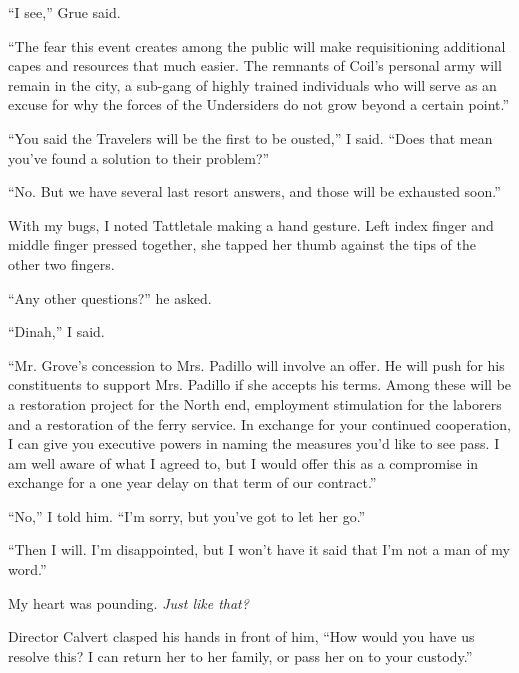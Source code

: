 ``I see,'' Grue said.



``The fear this event creates among the public will make requisitioning additional capes and resources that much easier.  The remnants of Coil's personal army will remain in the city, a sub-gang of highly trained individuals who will serve as an excuse for why the forces of the Undersiders do not grow beyond a certain point.''



``You said the Travelers will be the first to be ousted,'' I said.  ``Does that mean you've found a solution to their problem?''



``No.  But we have several last resort answers, and those will be exhausted soon.''



With my bugs, I noted Tattletale making a hand gesture.  Left index finger and middle finger pressed together, she tapped her thumb against the tips of the other two fingers.



``Any other questions?'' he asked.



``Dinah,'' I said.



``Mr. Grove's concession to Mrs. Padillo will involve an offer.  He will push for his constituents to support Mrs. Padillo if she accepts his terms.  Among these will be a restoration project for the North end, employment stimulation for the laborers and a restoration of the ferry service.  In exchange for your continued cooperation, I can give you executive powers in naming the measures you'd like to see pass.  I am well aware of what I agreed to, but I would offer this as a compromise in exchange for a one year delay on that term of our contract.''



``No,'' I told him.  ``I'm sorry, but you've got to let her go.''



``Then I will.  I'm disappointed, but I won't have it said that I'm not a man of my word.''



My heart was pounding.  \emph{Just like that?}



Director Calvert clasped his hands in front of him, ``How would you have us resolve this?  I can return her to her family, or pass her on to your custody.''



